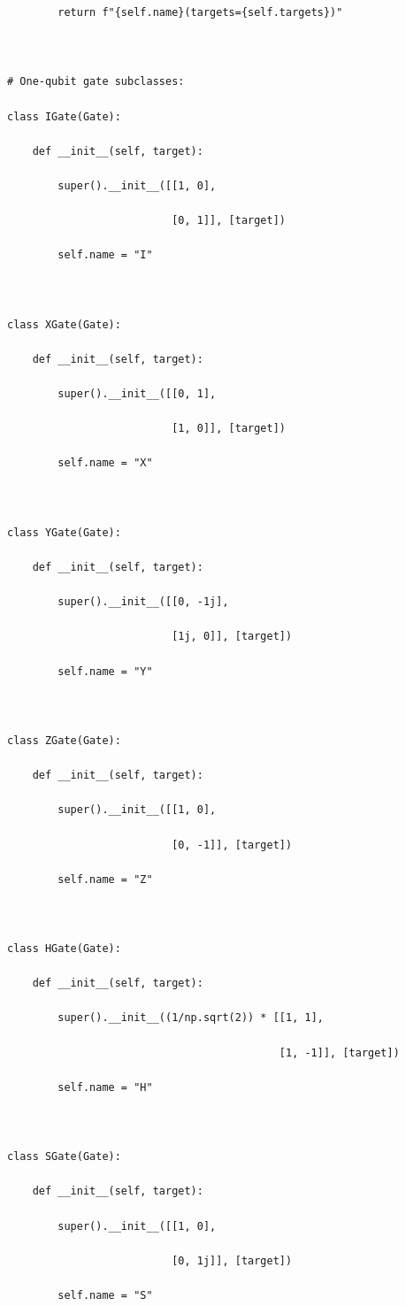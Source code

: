 \documentclass{beamer}
\begin{document}
\begin{frame}
\begin{verbatim}
        return f"{self.name}(targets={self.targets})"



# One-qubit gate subclasses:

class IGate(Gate):

    def __init__(self, target):

        super().__init__([[1, 0],

                          [0, 1]], [target])

        self.name = "I"



class XGate(Gate):

    def __init__(self, target):

        super().__init__([[0, 1],

                          [1, 0]], [target])

        self.name = "X"



class YGate(Gate):

    def __init__(self, target):

        super().__init__([[0, -1j],

                          [1j, 0]], [target])

        self.name = "Y"



class ZGate(Gate):

    def __init__(self, target):

        super().__init__([[1, 0],

                          [0, -1]], [target])

        self.name = "Z"



class HGate(Gate):

    def __init__(self, target):

        super().__init__((1/np.sqrt(2)) * [[1, 1],

                                           [1, -1]], [target])

        self.name = "H"



class SGate(Gate):

    def __init__(self, target):

        super().__init__([[1, 0],

                          [0, 1j]], [target])

        self.name = "S"




\end{verbatim}
\end{frame}
\end{document}
